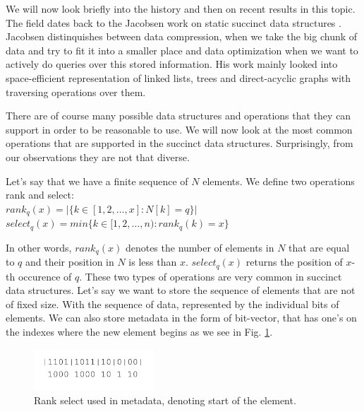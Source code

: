 We will now look briefly into the history and then on recent results in this topic. The field dates back to the Jacobsen work on static succinct data structures \cite{jacobson1988succinct}. Jacobsen distinquishes between data compression, when we take the big chunk of data and try to fit it into a smaller place and
data optimization when we want to actively do queries over this stored information. His work mainly looked into space-efficient representation of linked lists, trees and direct-acyclic graphs with traversing operations over them.

There are of course many possible data structures and operations that they can support in order to be reasonable to use. We will now look at the most common operations that are supported in the succinct data structures. Surprisingly, from our observations they are not that diverse.

\begin{theorem}
Let's say that we have a finite sequence of $N$ elements.
We define two operations rank and select: \\
$rank_q(x) = | \{ k \in [ 1, 2, \ldots, x]:N[k] = q  \} |$ \\
$select_q(x) = min \{ k \in [ 1, 2, \ldots, n):rank_q(k)=x  \} $
\end{theorem}

In other words, $rank_q(x)$ denotes the number of elements in $N$ that are equal to $q$ and their position in $N$ is less than $x$. $select_q(x)$ returns the position of $x$-th occurence of $q$.
These two types of operations are very common in succinct data structures. Let's say we want to store the sequence of elements that are not of fixed size.
With the sequence of data, represented by the individual bits of elements. We can also store metadata in the form of bit-vector, that has one's on the indexes
where the new element begins as we see in Fig. \ref{obr:obr_rank_select}.

\begin{figure}
\centerline{\includegraphics[width=0.4\textwidth]{images/obr_rank_select}}
\caption[Rank select usage in representation of sequence of elements with different size]{Rank select used in metadata, denoting start of the element.}
\label{obr:obr_rank_select}
\end{figure}

